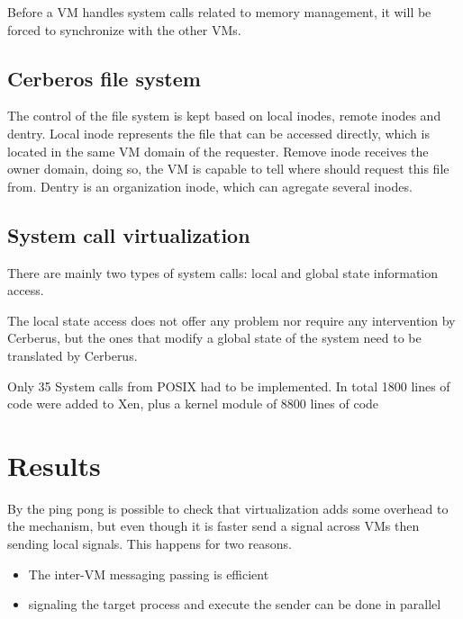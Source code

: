 \documentclass[journal]{IEEEtran}
\begin{document}
\begin{itemize}
	Before a VM handles system calls related to memory management, it will be forced to synchronize with the other VMs.
	
	\subsection{Cerberos file system}
	
	The control of the file system is kept based on local inodes, remote inodes and dentry. Local inode represents the file that can be accessed directly, which is located in the same VM domain of the requester. Remove inode receives the owner domain, doing so, the VM is capable to tell where should request this file from. Dentry is an organization inode, which can agregate several inodes.

	\subsection{System call virtualization}

	There are mainly two types of system calls: local and global state information access.
	
	The local state access does not offer any problem nor require any intervention by Cerberus, but the ones that modify a global state of the system need to be translated by Cerberus.
	
	Only 35 System calls from POSIX had to be implemented. In total 1800 lines of code were added to Xen, plus a kernel module of 8800 lines of code %
	
	\section{Results}
	
	By the ping pong is possible to check that virtualization adds some overhead to the mechanism, but even though it is faster send a signal across VMs then sending local signals. This happens for two reasons.
	\begin{itemize}
	\item The inter-VM messaging passing is efficient
	\item signaling the target process and execute the sender can be done in parallel
	\end{itemize}
	

\end{itemize}
\end{document}
